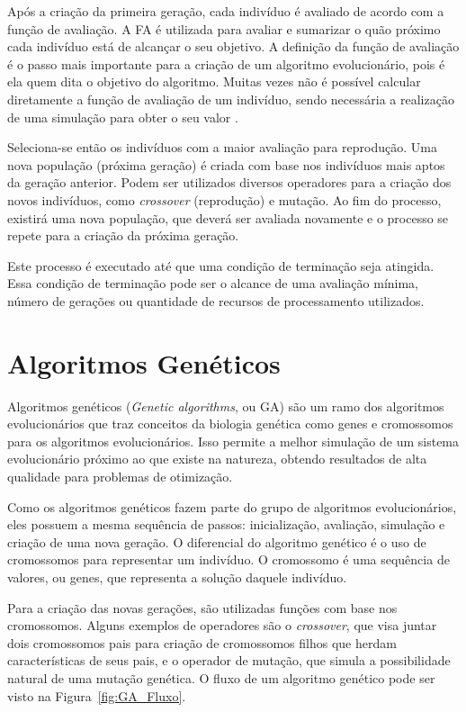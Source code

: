 \documentclass[12pt,oneside,a4paper,english,french,spanish,brazil,]{abntex2}
\begin{document}
Após a criação da primeira geração, cada indivíduo é avaliado de acordo com a função de avaliação. A FA é utilizada para avaliar e sumarizar o quão próximo cada indivíduo está de alcançar o seu objetivo. A definição da função de avaliação é o passo mais importante para a criação de um algoritmo evolucionário, pois é ela quem dita o objetivo do algoritmo. Muitas vezes não é possível calcular diretamente a função de avaliação de um indivíduo, sendo necessária a realização de uma simulação para obter o seu valor \cite{linden:2008}.

Seleciona-se então os indivíduos com a maior avaliação para reprodução. Uma nova população (próxima geração) é criada com base nos indivíduos mais aptos da geração anterior. Podem ser utilizados diversos operadores para a criação dos novos indivíduos, como \textit{crossover} (reprodução) e mutação. Ao fim do processo, existirá uma nova população, que deverá ser avaliada novamente e o processo se repete para a criação da próxima geração.

Este processo é executado até que uma condição de terminação seja atingida. Essa condição de terminação pode ser o alcance de uma avaliação mínima, número de gerações ou quantidade de recursos de processamento utilizados.

\section{Algoritmos Genéticos}

Algoritmos genéticos (\textit{Genetic algorithms}, ou GA) são um ramo dos algoritmos evolucionários que traz conceitos da biologia genética como genes e cromossomos para os algoritmos evolucionários. Isso permite a melhor simulação de um sistema evolucionário próximo ao que existe na natureza, obtendo resultados de alta qualidade para problemas de otimização.

Como os algoritmos genéticos fazem parte do grupo de algoritmos evolucionários, eles possuem a mesma sequência de passos: inicialização, avaliação, simulação e criação de uma nova geração. O diferencial do algoritmo genético é o uso de cromossomos para representar um indivíduo. O cromossomo é uma sequência de valores, ou genes, que representa a solução daquele indivíduo.

Para a criação das novas gerações, são utilizadas funções com base nos cromossomos. Alguns exemplos de operadores são o \textit{crossover}, que visa juntar dois cromossomos pais para criação de cromossomos filhos que herdam características de seus pais, e o operador de mutação, que simula a possibilidade natural de uma mutação genética. O fluxo de um algoritmo genético pode ser visto na Figura~\ref{fig:GA_Fluxo}.
\end{document}
